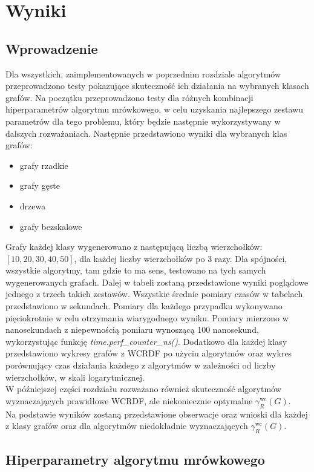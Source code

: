 \chapter{Wyniki}

\section{Wprowadzenie}

Dla wszystkich, zaimplementowanych w poprzednim rozdziale algorytmów przeprowadzono testy pokazujące skuteczność ich działania na wybranych klasach grafów. Na początku przeprowadzono testy dla różnych kombinacji hiperparametrów algorytmu mrówkowego, w celu uzyskania najlepszego zestawu parametrów dla tego problemu, który będzie następnie wykorzystywany w dalszych rozważaniach. Następnie przedstawiono wyniki dla wybranych klas grafów:
\begin{itemize}
    \item grafy rzadkie
    \item grafy gęste
    \item drzewa
    \item grafy bezskalowe
\end{itemize}
Grafy każdej klasy wygenerowano z następującą liczbą wierzchołków: $[10, 20, 30, 40, 50]$, dla każdej liczby wierzchołków po 3 razy. Dla spójności, wszystkie algorytmy, tam gdzie to ma sens, testowano na tych samych wygenerowanych grafach. Dalej w tabeli zostaną przedstawione wyniki poglądowe jednego z trzech takich zestawów. 
Wszystkie średnie pomiary czasów w tabelach przedstawiono w sekundach. Pomiary dla każdego przypadku wykonywano pięciokrotnie w celu otrzymania wiarygodnego wyniku. Pomiary mierzono w nanosekundach z niepewnością pomiaru wynoszącą 100 nanosekund, wykorzystując funkcję \textit{time.perf\_counter\_ns()}. Dodatkowo dla każdej klasy przedstawiono wykresy grafów z WCRDF po użyciu algorytmów oraz wykres porównujący czas działania każdego z algorytmów w zależności od liczby wierzchołków, w skali logarytmicznej.\\
W późniejszej części rozdziału rozważano również skuteczność algorytmów wyznaczających prawidłowe WCRDF, ale niekoniecznie optymalne $\gamma^{\text{wc}}_R(G)$.\\
Na podstawie wyników zostaną przedstawione obserwacje oraz wnioski dla każdej z klasy grafów oraz dla algorytmów niedokładnie wyznaczających $\gamma^{\text{wc}}_R(G)$.

\section{Hiperparametry algorytmu mrówkowego}

